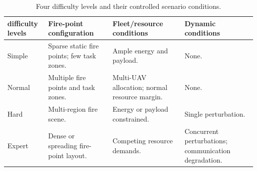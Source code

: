 \begin{table}[htbp]
    \centering
    \caption{Four difficulty levels and their controlled scenario conditions.}
    \label{tab:scenario-controls}
    \footnotesize
    \setlength{\tabcolsep}{4.5pt}
    \renewcommand{\arraystretch}{1.2}
    \begin{tabularx}{\textwidth}{
        @{}
        >{\raggedright\arraybackslash}p{1.5cm}
        >{\raggedright\arraybackslash}X
        >{\raggedright\arraybackslash}X
        >{\raggedright\arraybackslash}X
        @{}
    }
        \toprule
        \textbf{difficulty levels} &
        \textbf{Fire-point configuration} &
        \textbf{Fleet/resource conditions} &
        \textbf{Dynamic conditions} \\
        \midrule
        Simple &
        Sparse static fire points; few task zones. &
        Ample energy and payload. &
        None. \\

        Normal &
        Multiple fire points and task zones. &
        Multi-UAV allocation; normal resource margin. &
        None. \\

        Hard &
        Multi-region fire scene. &
        Energy or payload constrained. &
        Single perturbation. \\

        Expert &
        Dense or spreading fire-point layout. &
        Competing resource demands. &
        Concurrent perturbations; communication degradation. \\
        \bottomrule
    \end{tabularx}
\end{table}
